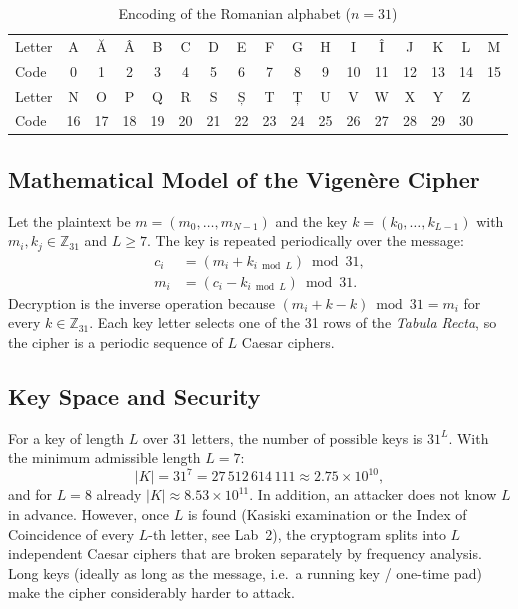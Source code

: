 \documentclass[12pt,a4paper]{article}
\begin{document}
\begin{table}[H]
\centering
\caption{Encoding of the Romanian alphabet ($n = 31$)}
\label{tab:alpha}
\small
\setlength{\tabcolsep}{3.2pt}
\begin{tabular}{l*{16}{c}}
\toprule
Letter & A & Ă & Â & B & C & D & E & F & G & H & I & Î & J & K & L & M \\
Code   & 0 & 1 & 2 & 3 & 4 & 5 & 6 & 7 & 8 & 9 & 10 & 11 & 12 & 13 & 14 & 15 \\
\midrule
Letter & N & O & P & Q & R & S & Ș & T & Ț & U & V & W & X & Y & Z & \\
Code   & 16 & 17 & 18 & 19 & 20 & 21 & 22 & 23 & 24 & 25 & 26 & 27 & 28 & 29 & 30 & \\
\bottomrule
\end{tabular}
\end{table}

\subsection{Mathematical Model of the Vigenère Cipher}
Let the plaintext be $m=(m_0,\dots,m_{N-1})$ and the key $k=(k_0,\dots,k_{L-1})$ with
$m_i,k_j\in\mathbb{Z}_{31}$ and $L\ge 7$. The key is repeated periodically over the message:
\begin{align}
  c_i &= (m_i + k_{i \bmod L}) \bmod 31, \label{eq:enc}\\
  m_i &= (c_i - k_{i \bmod L}) \bmod 31. \label{eq:dec}
\end{align}
Decryption is the inverse operation because $(m_i + k - k) \bmod 31 = m_i$ for every
$k\in\mathbb{Z}_{31}$. Each key letter selects one of the 31 rows of the \emph{Tabula Recta},
so the cipher is a periodic sequence of $L$ Caesar ciphers.

\subsection{Key Space and Security}
For a key of length $L$ over 31 letters, the number of possible keys is $31^{L}$. With the minimum
admissible length $L = 7$:
\[
  |K| = 31^{7} = 27\,512\,614\,111 \approx 2.75\times10^{10},
\]
and for $L = 8$ already $|K|\approx 8.53\times10^{11}$. In addition, an attacker does not know
$L$ in advance. However, once $L$ is found (Kasiski examination or the Index of Coincidence of
every $L$-th letter, see Lab~2), the cryptogram splits into $L$ independent Caesar ciphers that
are broken separately by frequency analysis. Long keys (ideally as long as the message, i.e.\ a
running key / one-time pad) make the cipher considerably harder to attack.
\end{document}
